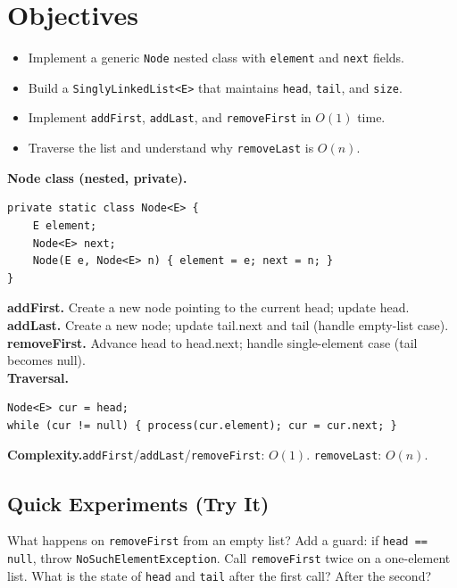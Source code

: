 \documentclass[11pt]{article}
\begin{document}
\labheader

\section*{Objectives}
\begin{itemize}[leftmargin=*,nosep]
  \item Implement a generic \texttt{Node} nested class with \texttt{element} and \texttt{next} fields.
  \item Build a \texttt{SinglyLinkedList<E>} that maintains \texttt{head}, \texttt{tail}, and \texttt{size}.
  \item Implement \texttt{addFirst}, \texttt{addLast}, and \texttt{removeFirst} in $O(1)$ time.
  \item Traverse the list and understand why \texttt{removeLast} is $O(n)$.
\end{itemize}

\begin{summary}
\textbf{Node class (nested, private).}
\begin{lstlisting}
private static class Node<E> {
    E element;
    Node<E> next;
    Node(E e, Node<E> n) { element = e; next = n; }
}
\end{lstlisting}

\textbf{addFirst.} Create a new node pointing to the current head; update head.\\
\textbf{addLast.} Create a new node; update tail.next and tail (handle empty-list case).\\
\textbf{removeFirst.} Advance head to head.next; handle single-element case (tail becomes null).\\
\textbf{Traversal.}
\begin{lstlisting}
Node<E> cur = head;
while (cur != null) { process(cur.element); cur = cur.next; }
\end{lstlisting}
\textbf{Complexity.}\quad \texttt{addFirst}/\texttt{addLast}/\texttt{removeFirst}: $O(1)$. \texttt{removeLast}: $O(n)$.
\end{summary}

\subsection*{Quick Experiments (Try It)}

\begin{tryit}{What happens on \texttt{removeFirst} from an empty list?}
Add a guard: if \texttt{head == null}, throw \texttt{NoSuchElementException}.
Call \texttt{removeFirst} twice on a one-element list.
What is the state of \texttt{head} and \texttt{tail} after the first call? After the second?
\end{tryit}
\end{document}
